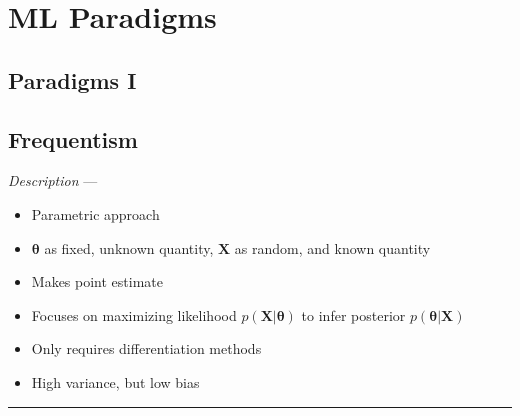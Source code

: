 \section{ML Paradigms}
\subsection*{Paradigms I}
\subsection*{Frequentism}
\emph{Description} --- 
\begin{itemize}
    \item Parametric approach
    \item $\boldsymbol{\theta}$ as fixed, unknown quantity, $\boldsymbol{X}$ as random, and known quantity
    \item Makes point estimate
    \item Focuses on maximizing likelihood $p(\boldsymbol{X}|\boldsymbol{\theta})$ to infer posterior $p(\boldsymbol{\theta}|\boldsymbol{X})$
    \item Only requires differentiation methods
    \item High variance, but low bias
\end{itemize}

{\color{lightgray}\hrule height 0.001mm}

